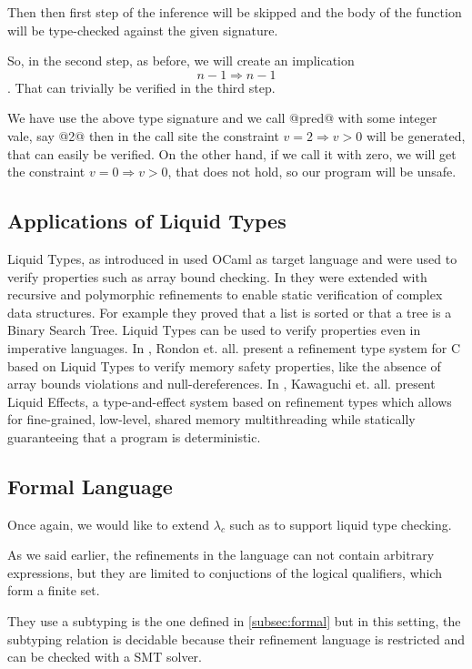 Then then first step of the inference will be skipped and the 
body of the function will be type-checked against the given signature.

So, in the second step, as before, we will create an implication
$$n-1 \Rightarrow n - 1 $$. That can trivially be verified in the third step.

We have use the above type signature and we call @pred@ with some integer vale, say @2@
then in the call site the constraint $v = 2 \Rightarrow v >0$ will be generated, 
that can easily be verified.
%
On the other hand, if we call it with zero, we will get the constraint
$v = 0 \Rightarrow v >0$, that does not hold, 
so our program will be unsafe.

\subsection{Applications of Liquid Types}

Liquid Types, as introduced in \cite{LiquidPLDI08} used OCaml as target language
and were used to verify properties such as array bound checking.
In \cite{LiquidPLDI09} they were extended with recursive and polymorphic refinements
to enable static verification of complex data structures. For example they proved
that a list is sorted or that a tree is a Binary Search Tree.
%
Liquid Types can be used to verify properties even in imperative languages.
In \cite{Rondon10}, Rondon et. all. present a refinement type system for
C based on Liquid Types to verify memory safety properties, 
like the absence of array bounds violations
and null-dereferences.
In \cite{Kawaguchi12},
Kawaguchi et. all. present Liquid Effects, a type-and-effect system based on refinement types
which allows for fine-grained, low-level, shared memory multithreading while statically guaranteeing that a program is deterministic. 

\subsection{Formal Language}
Once again, we would like to extend $\lambda_c$ such as to support liquid type checking.

As we said earlier, the refinements in the language 
can not contain arbitrary expressions, but they are limited
to conjuctions of the logical qualifiers, which form a finite set.

They use a subtyping is the one defined in \ref{subsec:formal} 
but in this setting,  
the subtyping relation is decidable
because their refinement language is restricted
and can be checked with a SMT solver.

